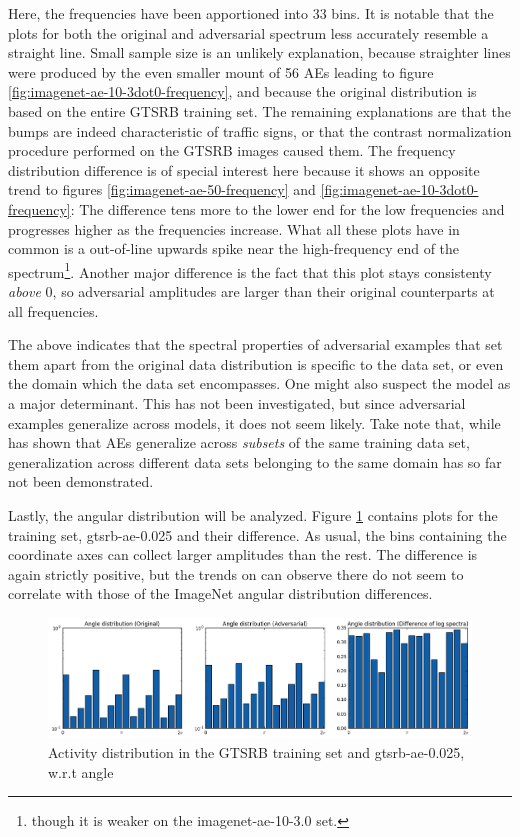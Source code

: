\documentclass[11pt, a4paper]{article}
\begin{document}
Here, the frequencies have been apportioned into 33 bins. It is notable that the plots for both the original and adversarial spectrum less accurately resemble a straight line. Small sample size is an unlikely explanation, because straighter lines were produced by the even smaller mount of 56 AEs leading to figure \ref{fig:imagenet-ae-10-3dot0-frequency}, and because the original distribution is based on the entire GTSRB training set. The remaining explanations are that the bumps are indeed characteristic of traffic signs, or that the contrast normalization procedure performed on the GTSRB images caused them. The frequency distribution difference is of special interest here because it shows an opposite trend to figures \ref{fig:imagenet-ae-50-frequency} and \ref{fig:imagenet-ae-10-3dot0-frequency}: The difference tens more to the lower end for the low frequencies and progresses higher as the frequencies increase. What all these plots have in common is a out-of-line upwards spike near the high-frequency end of the spectrum\footnote{though it is weaker on the imagenet-ae-10-3.0 set.}. Another major difference is the fact that this plot stays consistenty \emph{above} 0, so adversarial amplitudes are larger than their original counterparts at all frequencies.

The above indicates that the spectral properties of adversarial examples that set them apart from the original data distribution is specific to the data set, or even the domain which the data set encompasses. One might also suspect the model as a major determinant. This has not been investigated, but since adversarial examples generalize across models, it does not seem likely. Take note that, while \cite{intriguing-properties-of-neural-networks} has shown that AEs generalize across \emph{subsets} of the same training data set, generalization across different data sets belonging to the same domain has so far not been demonstrated.

Lastly, the angular distribution will be analyzed. Figure \ref{fig:gtsrb-ae-0.025-angle} contains plots for the training set, gtsrb-ae-0.025 and their difference. As usual, the bins containing the coordinate axes can collect larger amplitudes than the rest. The difference is again strictly positive, but the trends on can observe there do not seem to correlate with those of the ImageNet angular distribution differences.

\begin{figure}[h!tb]
	\centering
	\includegraphics[width=\textwidth]{images/spectra/gtsrb-ae-0dot025-minconfidence-0dot5-maxorig-0-angle-16-bins.png}
	\caption[Log spectra of GTSRB and adversarial examples, angular analysis]{Activity distribution in the GTSRB training set and gtsrb-ae-0.025, w.r.t angle}
	\label{fig:gtsrb-ae-0.025-angle}
\end{figure}
\end{document}
